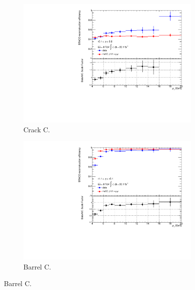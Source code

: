 \begin{figure}[htbp]
  \centering
    \begin{subfigure}[b]{0.45\textwidth}
      \includegraphics[width=\textwidth]{PartCalibration2012/Plots/SFPlots/Crack_C_reco.pdf}
      \caption{Crack C.} \label{fig:CalibrationRecoSFCrackC}
    \end{subfigure}
    \hfill
    \begin{subfigure}[b]{0.45\textwidth}
      \includegraphics[width=\textwidth]{PartCalibration2012/Plots/SFPlots/Barrel_C_reco.pdf}
      \caption{Barrel C.} \label{fig:CalibrationRecoSFBarrelC}
    \end{subfigure}


\end{figure}
